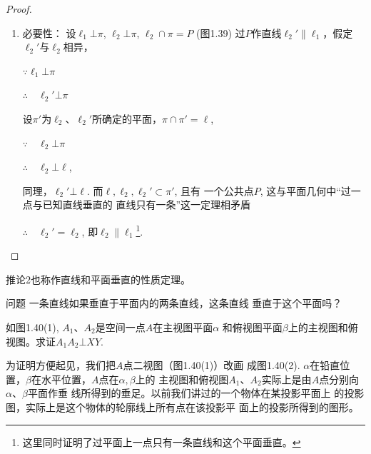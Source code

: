 \begin{proof}
\begin{enumerate}
\begin{figure}[htp]
\begin{minipage}[t]{0.48\textwidth}
\begin{tikzpicture}[>=latex, scale=1]
\end{tikzpicture}
    \caption{}
    \end{minipage}
    \end{figure}
  

  \item 必要性：
  设$ \ell_1\bot \pi$, $ \ell_2\bot \pi$, $\ell_2\cap\pi =P$ (图1.39) 过$P$作直线$\ell_2'\parallel \ell_1$，假定$\ell_2'$与$\ell_2$相异，

  $\because \ell_1\bot \pi$

  $\therefore\quad \ell_2'\bot \pi$

  设$\pi'$为$\ell_2$、$\ell_2'$所确定的平面，$\pi\cap \pi'=\ell$,

$\because\quad \ell_2\bot \pi$

$\therefore\quad \ell_2\bot\ell$,

同理，$\ell_2'\bot\ell$. 而$\ell,\ell_2,\ell_2'\subset \pi'$, 且有
  一个公共点$P$, 这与平面几何中“过一点与已知直线垂直的
  直线只有一条”这一定理相矛盾
  
$\therefore\quad \ell_2'=\ell_2$, 即$\ell_2\parallel \ell_1$\footnote{这里同时证明了过平面上一点只有一条直线和这个平面垂直。}.
\end{enumerate}
\end{proof}

  推论2也称作直线和平面垂直的性质定理。

\begin{blk}{问题}
  一条直线如果垂直于平面内的两条直线，这条直线
  垂直于这个平面吗？
\end{blk}

\begin{example}
如图1.40(1), $A_1$、$A_2$是空间一点$A$在主视图平面$\alpha$
和俯视图平面$\beta$上的主视图和俯视图。求证$A_1A_2\bot XY$.

为证明方便起见，我们把$A$点二视图（图1.40(1)）改画
成图1.40(2). $\alpha$在铅直位置，$\beta$在水平位置，$A$点在$\alpha,\beta$上的
主视图和俯视图$A_1$、$A_2$实际上是由$A$点分别向$\alpha$、$\beta$平面作垂
线所得到的垂足。以前我们讲过的一个物体在某投影平面上
的投影图，实际上是这个物体的轮廓线上所有点在该投影平
面上的投影所得到的图形。
\end{example}

